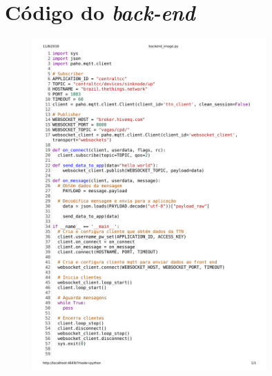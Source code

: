 \documentclass[oneside,openright,12pt]{ufsm_2015} %
\begin{document}
\chapter{Código do \textit{back-end}}
\label{apendice:back-end-code}
        \begin{figure}[H]
        \centering
        \includegraphics[width=0.8\textwidth]{figuras/backend_image.png}
        \vspace{\baselineskip} %
\end{figure}
\end{document}
